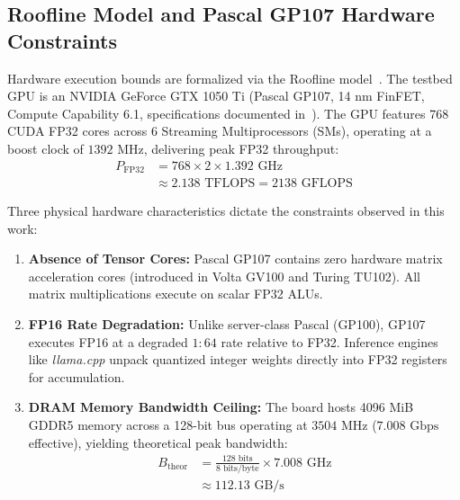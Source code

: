 \documentclass[10pt,a4paper,twocolumn]{article}
\begin{document}
\subsection{Roofline Model and Pascal GP107 Hardware Constraints}

Hardware execution bounds are formalized via the Roofline model~\cite{williams2009}. The testbed GPU is an NVIDIA GeForce GTX 1050 Ti (Pascal GP107, 14 nm FinFET, Compute Capability 6.1, specifications documented in~\cite{nvidia2016pascal}). The GPU features 768 CUDA FP32 cores across 6 Streaming Multiprocessors (SMs), operating at a boost clock of $1392\text{ MHz}$, delivering peak FP32 throughput:
\begin{equation}
\begin{aligned}
P_{\text{FP32}} &= 768 \times 2 \times 1.392\text{ GHz}\\
&\approx 2.138\text{ TFLOPS} = 2138\text{ GFLOPS}
\end{aligned}
\end{equation}

Three physical hardware characteristics dictate the constraints observed in this work:
\begin{enumerate}[leftmargin=1.5em,itemsep=0.2em]
    \item \textbf{Absence of Tensor Cores:} Pascal GP107 contains zero hardware matrix acceleration cores (introduced in Volta GV100 and Turing TU102). All matrix multiplications execute on scalar FP32 ALUs.
    \item \textbf{FP16 Rate Degradation:} Unlike server-class Pascal (GP100), GP107 executes FP16 at a degraded $1:64$ rate relative to FP32. Inference engines like \emph{llama.cpp} unpack quantized integer weights directly into FP32 registers for accumulation.
    \item \textbf{DRAM Memory Bandwidth Ceiling:} The board hosts 4096 MiB GDDR5 memory across a 128-bit bus operating at $3504\text{ MHz}$ ($7.008\text{ Gbps}$ effective), yielding theoretical peak bandwidth:
    \begin{equation}
    \begin{aligned}
    B_{\text{theor}} &= \frac{128\text{ bits}}{8\text{ bits/byte}} \times 7.008\text{ GHz}\\
    &\approx 112.13\text{ GB/s}
    \end{aligned}
    \end{equation}
\end{enumerate}
\end{document}
